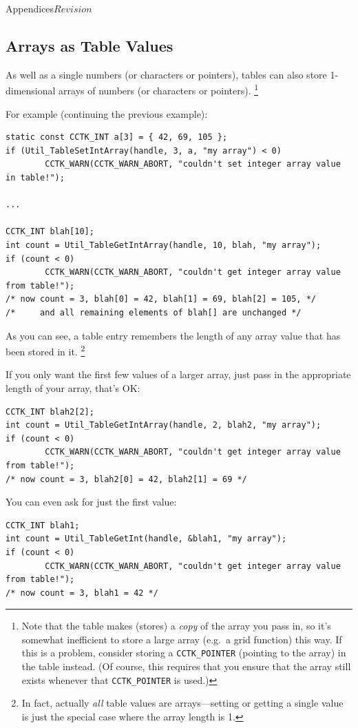 \begin{cactuspart}{Appendices}{}{$Revision$}

\subsection{Arrays as Table Values}

As well as a single numbers (or characters or pointers), tables can
also store 1-dimensional arrays of numbers (or characters or pointers).%
\footnote{%
	 Note that the table makes (stores) a \emph{copy} of the array
	 you pass in, so it's somewhat inefficient to store a large array
	 (e.g.~a grid function) this way.  If this is a problem, consider
	 storing a \texttt{CCTK\_POINTER} (pointing to the array) in the table
	 instead.  (Of course, this requires that you ensure that the array still exists whenever that \texttt{CCTK\_POINTER} is used.)
	 }%

For example (continuing the previous example):
\begin{verbatim}
static const CCTK_INT a[3] = { 42, 69, 105 };
if (Util_TableSetIntArray(handle, 3, a, "my array") < 0)
        CCTK_WARN(CCTK_WARN_ABORT, "couldn't set integer array value in table!");

...

CCTK_INT blah[10];
int count = Util_TableGetIntArray(handle, 10, blah, "my array");
if (count < 0)
        CCTK_WARN(CCTK_WARN_ABORT, "couldn't get integer array value from table!");
/* now count = 3, blah[0] = 42, blah[1] = 69, blah[2] = 105, */
/*     and all remaining elements of blah[] are unchanged */
\end{verbatim}
As you can see, a table entry remembers the length of any array
value that has been stored in it.%
\footnote{%
	 In fact, actually \emph{all} table values are
	 arrays---setting or getting a single value is
	 just the special case where the array length is 1.
	 }%
{}

If you only want the first few values of a larger array, just pass
in the appropriate length of your array,
that's OK:
\begin{verbatim}
CCTK_INT blah2[2];
int count = Util_TableGetIntArray(handle, 2, blah2, "my array");
if (count < 0)
        CCTK_WARN(CCTK_WARN_ABORT, "couldn't get integer array value from table!");
/* now count = 3, blah2[0] = 42, blah2[1] = 69 */
\end{verbatim}
You can even ask for just the first value:
\begin{verbatim}
CCTK_INT blah1;
int count = Util_TableGetInt(handle, &blah1, "my array");
if (count < 0)
        CCTK_WARN(CCTK_WARN_ABORT, "couldn't get integer array value from table!");
/* now count = 3, blah1 = 42 */
\end{verbatim}


\end{cactuspart}
